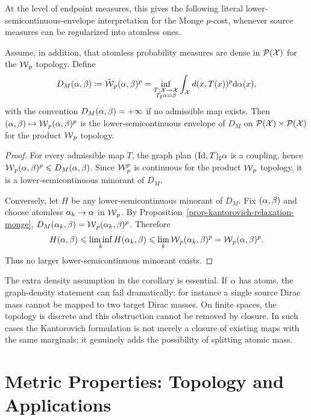 At the level of endpoint measures, this gives the following literal lower-semicontinuous-envelope interpretation for the Monge $p$-cost, whenever source measures can be regularized into atomless ones.

\begin{cor}\label{cor-wasserstein-lsc-envelope-monge-distance}
	Assume, in addition, that atomless probability measures are dense in $\mathcal{P}(\mathcal{X})$ for the $\operatorname{\mathcal{W}}_p$ topology. Define
	\[
		D_M(\alpha,\beta)
		\coloneqq
		\tilde{\operatorname{\mathcal{W}}}_p(\alpha,\beta)^p
		=
		\inf_{\substack{T:\mathcal{X}\to\mathcal{X}\\ T_\sharp\alpha=\beta}}
		\int_{\mathcal{X}} d(x,T(x))^p\mathrm{d}\alpha(x),
	\]
	with the convention $D_M(\alpha,\beta)=+\infty$ if no admissible map exists. Then $(\alpha,\beta)\mapsto\operatorname{\mathcal{W}}_p(\alpha,\beta)^p$ is the lower-semicontinuous envelope of $D_M$ on $\mathcal{P}(\mathcal{X})\times\mathcal{P}(\mathcal{X})$ for the product $\operatorname{\mathcal{W}}_p$ topology.
\end{cor}
\begin{proof}
	For every admissible map $T$, the graph plan $(\mathrm{Id},T)_\sharp\alpha$ is a coupling, hence $\operatorname{\mathcal{W}}_p(\alpha,\beta)^p\leqslant D_M(\alpha,\beta)$. Since $\operatorname{\mathcal{W}}_p^p$ is continuous for the product $\operatorname{\mathcal{W}}_p$ topology, it is a lower-semicontinuous minorant of $D_M$.

	Conversely, let $H$ be any lower-semicontinuous minorant of $D_M$. Fix $(\alpha,\beta)$ and choose atomless $\alpha_k\to\alpha$ in $\operatorname{\mathcal{W}}_p$. By Proposition~\ref{prop-kantorovich-relaxation-monge}, $D_M(\alpha_k,\beta)=\operatorname{\mathcal{W}}_p(\alpha_k,\beta)^p$. Therefore
	\[
		H(\alpha,\beta)
		\leqslant
		\liminf_k H(\alpha_k,\beta)
		\leqslant
		\lim_k \operatorname{\mathcal{W}}_p(\alpha_k,\beta)^p
		=
		\operatorname{\mathcal{W}}_p(\alpha,\beta)^p.
	\]
	Thus no larger lower-semicontinuous minorant exists.
\end{proof}

The extra density assumption in the corollary is essential. If $\alpha$ has atoms, the graph-density statement can fail dramatically: for instance a single source Dirac mass cannot be mapped to two target Dirac masses. On finite spaces, the topology is discrete and this obstruction cannot be removed by closure. In such cases the Kantorovich formulation is not merely a closure of existing maps with the same marginals; it genuinely adds the possibility of splitting atomic mass.


\section{Metric Properties: Topology and Applications}

